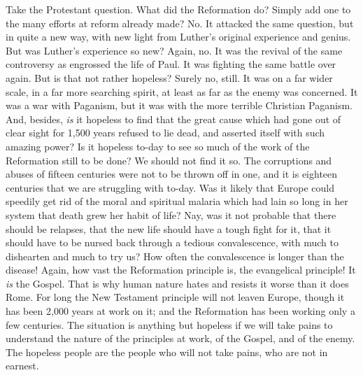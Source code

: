 \documentclass[12pt,a5paper,oneside]{book}
\begin{document}
Take the Protestant question. What did the 
Reformation do? Simply add one to the many efforts 
at reform already made? No. It attacked the same 
question, but in quite a new way, with new light from 
Luther's original experience and genius. But was 
Luther's experience so new? Again, no. It was the 
revival of the same controversy as engrossed the life 
of Paul. It was fighting the same battle over again. 
But is that not rather hopeless? Surely no, still. It 
was on a far wider scale, in a far more searching spirit, 
at least as far as the enemy was concerned. It was a 
war with Paganism, but it was with the more terrible 
Christian Paganism. And, besides, \textit{is} it hopeless to 
find that the great cause which had gone out of clear 
sight for 1,500 years refused to lie dead, and asserted 
itself with such amazing power? Is it hopeless to-day 
to see so much of the work of the Reformation 
still to be done? We should not find it so. The 
corruptions and abuses of fifteen centuries were not 
to be thrown off in one, and it is eighteen centuries 
that we are struggling with to-day. Was it likely 
that Europe could speedily get rid of the moral and 
spiritual malaria which had lain so long in her system 
that death grew her habit of life? Nay, was it not 
probable that there should be relapses, that the new 
life should have a tough fight for it, that it should 
have to be nursed back through a tedious convalescence,
with much to dishearten and much to try us? 
How often the convalescence is longer than the 
disease! Again, how vast the Reformation principle 
is, the evangelical principle! It \textit{is} the Gospel. That 
is why human nature hates and resists it worse than it 
does Rome. For long the New Testament principle 
will not leaven Europe, though it has been 2,000 years 
at work on it; and the Reformation has been working 
only a few centuries. The situation is anything but 
hopeless if we will take pains to understand the 
nature of the principles at work, of the Gospel, and 
of the enemy. The hopeless people are the people 
who will not take pains, who are not in earnest. 
\end{document}
